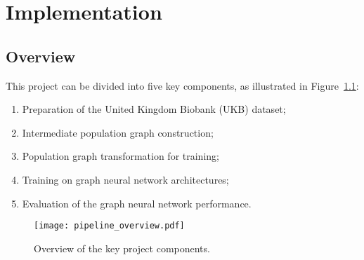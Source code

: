 \chapter{Implementation}
\label{chapter:implementation}


\section{Overview}

This project can be divided into five key components, as illustrated in Figure~\ref{pipeline-overview}:
\begin{enumerate}
    \item Preparation of the United Kingdom Biobank (UKB) dataset;
    \item Intermediate population graph construction;
    \item Population graph transformation for training;
    \item Training on graph neural network architectures;
    \item Evaluation of the graph neural network performance.
\end{enumerate}

\begin{figure}[h]
    \centering
    \texttt{[image: pipeline\_overview.pdf]}
    \caption{Overview of the key project components.}\label{pipeline-overview}
\end{figure}

